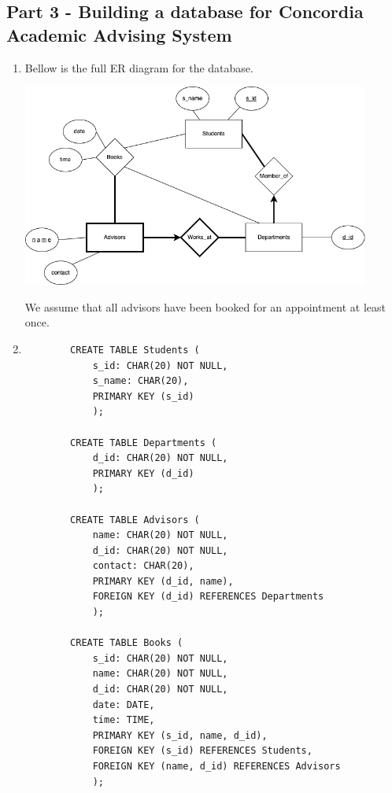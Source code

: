 \subsection*{Part 3 - Building a database for Concordia Academic Advising System}

\begin{enumerate}[label = {(\alph*)}]
    \item Bellow is the full ER diagram for the database.
    
    \begin{center}
        \includegraphics[width=0.9\textwidth]{img/3a.png}
    \end{center}
    We assume that all advisors have been booked for an appointment at least once.
    
    \item
    \begin{verbatim}
        CREATE TABLE Students (
            s_id: CHAR(20) NOT NULL,
            s_name: CHAR(20),
            PRIMARY KEY (s_id)
            );
            
        CREATE TABLE Departments (
            d_id: CHAR(20) NOT NULL,
            PRIMARY KEY (d_id)
            );
        
        CREATE TABLE Advisors (
            name: CHAR(20) NOT NULL,
            d_id: CHAR(20) NOT NULL,
            contact: CHAR(20),
            PRIMARY KEY (d_id, name),
            FOREIGN KEY (d_id) REFERENCES Departments
            );
        
        CREATE TABLE Books (
            s_id: CHAR(20) NOT NULL,
            name: CHAR(20) NOT NULL,
            d_id: CHAR(20) NOT NULL,
            date: DATE,
            time: TIME,
            PRIMARY KEY (s_id, name, d_id),
            FOREIGN KEY (s_id) REFERENCES Students,
            FOREIGN KEY (name, d_id) REFERENCES Advisors
            );
        

\end{verbatim}
\end{enumerate}
